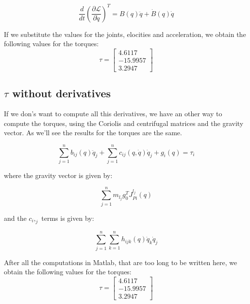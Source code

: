 \documentclass{article}
\begin{document}
\begin{equation}
    \frac{d}{dt} \left( \frac{\partial \mathcal{L}}{\partial \dot{q}} \right)^T = B(q) \ddot{q} + \dot{B}(q) \dot{q}
\end{equation}


If we substitute the values for the joints, elocities and acceleration, we obtain the following values for the torques:
\begin{equation}
    \tau = \begin{bmatrix}
        4.6117   \\
        -15.9957 \\
        3.2947
    \end{bmatrix}
\end{equation}

\subsection{$\tau$ without derivatives}

If we don's want to compute all this derivatives, we have an other way to compute the torques, using the Coriolis and centrifugal matrices and the gravity vector.
As we'll see the results for the torques are the same.

\begin{equation}
    \sum_{j=1}^{n} b_{ij}(q) \ddot{q}_j + \sum_{j=1}^{n} c_{ij}(q, \dot{q}) \dot{q}_j + g_i(q) = \tau_i
\end{equation}

where the gravity vector is given by:

\begin{equation}
    \sum_{j=1}^{n} m_{l_j} g_0^T J_{Pi}^{l_j}(q)
\end{equation}


and the $c_i,_j$ terms is given by:

\begin{equation}
    \sum_{j=1}^{n} \sum_{k=1}^{n} h_{ijk}(q) \dot{q}_k \dot{q}_j
\end{equation}


After all the computations in Matlab, that are too long to be written here, we obtain the following values for the torques:
\begin{equation}
    \tau = \begin{bmatrix}
        4.6117   \\
        -15.9957 \\
        3.2947
    \end{bmatrix}
\end{equation}
\end{document}
